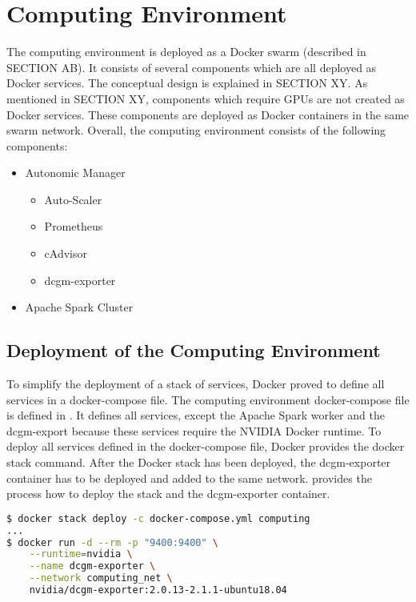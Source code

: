 \section{Computing Environment}
The computing environment is deployed as a Docker swarm (described in SECTION AB). It consists of several components which are all deployed as Docker services. The conceptual design is explained in SECTION XY.
As mentioned in SECTION XY, components which require GPUs are not created as Docker services. These components are deployed as Docker containers in the same swarm network.
Overall, the computing environment consists of the following components:
\begin{itemize}
\item Autonomic Manager
\begin{itemize}
\item Auto-Scaler
\item Prometheus
\item cAdvisor
\item dcgm-exporter
\end{itemize}

\item Apache Spark Cluster
\end{itemize}


\subsection{Deployment of the Computing Environment}
%
To simplify the deployment of a stack of services, Docker proved to define all services in a docker-compose file.
% 
The computing environment docker-compose file is defined in .
%
It defines all services, except the Apache Spark worker and the dcgm-export because these services require the NVIDIA Docker runtime.
%
To deploy all services defined in the docker-compose file, Docker provides the docker stack command.
%
After the Docker stack has been deployed, the dcgm-exporter container has to be deployed and added to the same network.
%
 provides the process how to deploy the stack and the dcgm-exporter container.
\begin{lstlisting}[label=lst:06_env_depl_docker-stack, caption=Auto-Scaler start command, language=sh]
$ docker stack deploy -c docker-compose.yml computing
...
$ docker run -d --rm -p "9400:9400" \
    --runtime=nvidia \
    --name dcgm-exporter \
    --network computing_net \
    nvidia/dcgm-exporter:2.0.13-2.1.1-ubuntu18.04
\end{lstlisting}


